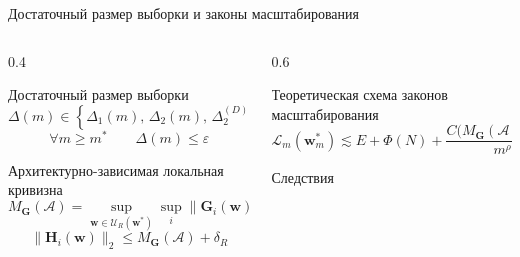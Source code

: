 \documentclass[aspectratio=169]{beamer}
\begin{document}
\begin{frame}{Достаточный размер выборки и законы масштабирования}
\begin{columns}[T]
    \begin{column}{0.4\textwidth}
        \begin{block}{Достаточный размер выборки}
            \vspace{-1.6em}
            \begin{equation*}
                \Delta(m) \in \left\{
                \Delta_1(m),\,
                \Delta_2(m),\,
                \Delta_2^{(D)}(m)
                \right\}
            \end{equation*}
            \begin{equation*}
                \forall m \geqslant m^*
                \qquad
                \Delta(m)\leqslant \varepsilon
            \end{equation*}
        \end{block}
        \vspace{-1.0em}
        \begin{block}{Архитектурно-зависимая локальная кривизна}
            \vspace{-2.0em}
            \[
                M_{\mathbf G}(\mathcal A)
                =
                \sup_{\mathbf w \in \mathcal U_R(\mathbf w^*)}
                \sup_i
                \|\mathbf G_i(\mathbf w)\|_2
            \]
            \[
                \|\mathbf H_i(\mathbf w)\|_2
                \leqslant
                M_{\mathbf G}(\mathcal A)+\delta_R
            \]
            \vspace{-1.0em}
        \end{block}
    \end{column}
    \begin{column}{0.6\textwidth}
        \begin{block}{Теоретическая схема законов масштабирования}
            \vspace{-0.4em}
            \begin{equation*}
                \mathcal L_m(\mathbf w_m^*)
                \lesssim
                E
                +
                \Phi(N)
                +
                \frac{
                    C\big(M_{\mathbf G}(\mathcal A)+\delta_R\big)
                }{m^{\rho}}
            \end{equation*}
            \vspace{-1.0em}
        \end{block}
        \begin{block}{Следствия}

\end{block}
\end{column}
\end{columns}
\end{frame}
\end{document}
